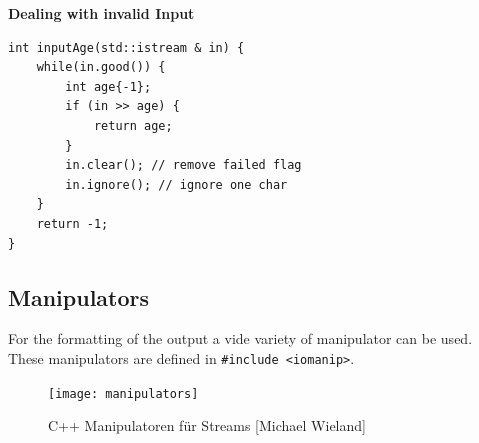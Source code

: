 \textbf{Dealing with invalid Input}
\begin{lstlisting}
int inputAge(std::istream & in) {
	while(in.good()) {
		int age{-1};
		if (in >> age) {
			return age;
		}
		in.clear(); // remove failed flag 
		in.ignore(); // ignore one char
	}
	return -1;
}	
\end{lstlisting}

\subsection{Manipulators}
For the formatting of the output a vide variety of manipulator can be used. These manipulators are defined in \lstinline|#include <iomanip>|.

\begin{figure}[h]
  \center
  \texttt{[image: manipulators]}
  \caption{C++ Manipulatoren für Streams [Michael Wieland]}
\end{figure}


